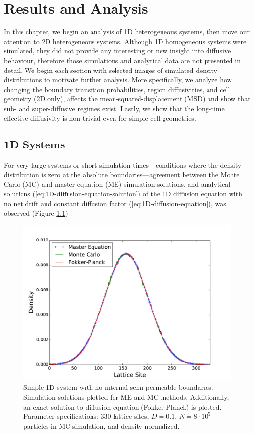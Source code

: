 \chapter{Results and Analysis}
\label{chapter:results-analysis}
	
	In this chapter, we begin an analysis of 1D heterogeneous systems, then move our attention to 2D heterogeneous systems. Although 1D homogeneous systems were simulated, they did not provide any interesting or new insight into diffusive behaviour, therefore those simulations and analytical data are not presented in detail. We begin each section with selected images of simulated density distributions to motivate further analysis. More specifically, we analyze how changing the boundary transition probabilities, region diffusivities, and cell geometry (2D only), affects the mean-squared-displacement (MSD) and show that sub- and super-diffusive regimes exist. Lastly, we show that the long-time effective diffusivity is non-trivial even for simple-cell geometries.
	
\section{1D Systems}
\label{sec:ra-1D}
	For very large systems or short simulation times---conditions where the density distribution is zero at the absolute boundaries---agreement between the Monte Carlo (MC) and master equation (ME) simulation solutions, and analytical solutions (\ref{eq:1D-diffusion-equation-solution}) of the 1D diffusion equation with no net drift and constant diffusion factor (\ref{eq:1D-diffusion-equation}), was observed (Figure \ref{fig:11U_homogeneous_plots_1D}). 

	\begin{figure}[h]
		\centering
		\includegraphics[width=1.0\linewidth]{../images/1D/11U_homogeneous_plots_1D}
		\caption{Simple 1D system with no internal semi-permeable boundaries. Simulation solutions plotted for ME and MC methods. Additionally, an exact solution to diffusion equation (Fokker-Planck) is plotted. Parameter specifications: 330 lattice sites, $ D = 0.1 $, $ N = 8\cdot10^5 $ particles in MC simulation, and density normalized.}
		\label{fig:11U_homogeneous_plots_1D}
	\end{figure}
	
